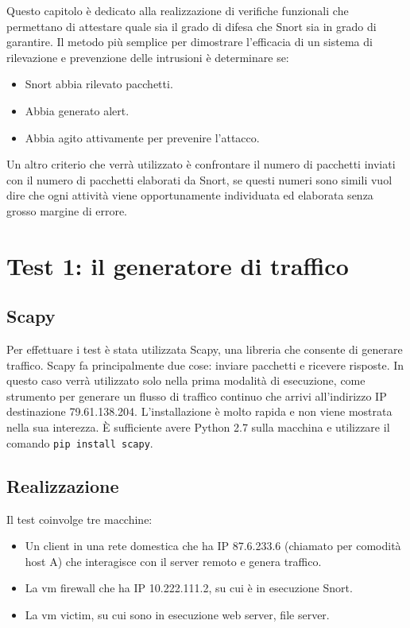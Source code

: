 Questo capitolo è dedicato alla realizzazione di verifiche funzionali che permettano di attestare quale sia il grado di difesa che Snort sia in grado di garantire. Il metodo più semplice per dimostrare l'efficacia di un sistema di rilevazione e prevenzione delle intrusioni è determinare se:
\begin{itemize}
    \item Snort abbia rilevato pacchetti.
    \item Abbia generato alert.
    \item Abbia agito attivamente per prevenire l'attacco.
\end{itemize}

Un altro criterio che verrà utilizzato è confrontare il numero di pacchetti inviati con il numero di pacchetti elaborati da Snort, se questi numeri sono simili vuol dire che ogni attività viene opportunamente individuata ed elaborata senza grosso margine di errore.

\section{Test 1: il generatore di traffico}

\subsection{Scapy}

Per effettuare i test è stata utilizzata Scapy, una libreria che consente di generare traffico. Scapy fa principalmente due cose: inviare pacchetti e ricevere risposte. In questo caso verrà utilizzato solo nella prima modalità di esecuzione, come strumento per generare un flusso di traffico continuo che arrivi all'indirizzo IP destinazione 79.61.138.204.
L'installazione è molto rapida e non viene mostrata nella sua interezza. È sufficiente avere Python 2.7 sulla macchina e utilizzare il comando \texttt{pip install scapy}.
~\cite{scapy}

\subsection{Realizzazione}

Il test coinvolge tre macchine:
\begin{itemize}
    \item Un client in una rete domestica che ha IP 87.6.233.6 (chiamato per comodità host A) che interagisce con il server remoto e genera traffico.
    \item La vm firewall che ha IP 10.222.111.2, su cui è in esecuzione Snort.
    \item La vm victim, su cui sono in esecuzione web server, file server.
\end{itemize}

